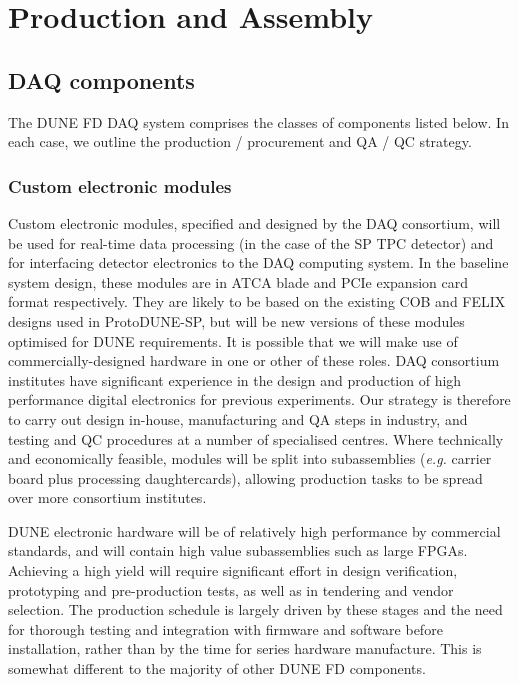 
\section{Production and Assembly}
\label{sec:fd-daq-prod-assy}

\subsection{DAQ components}

The DUNE FD DAQ system comprises the classes of components listed below. In each case, we outline the production / procurement and QA / QC strategy.

\subsubsection{Custom electronic modules}

Custom electronic modules, specified and designed by the DAQ consortium,
will be used for real-time data processing (in the case of the SP TPC
detector) and for interfacing detector electronics to the DAQ computing
system. In the baseline system design, these modules are in ATCA blade
and PCIe expansion card format respectively. They are likely to be based
on the existing COB and FELIX designs used in ProtoDUNE-SP, but will be
new versions of these modules optimised for DUNE requirements. It is
possible that we will make use of commercially-designed hardware in one
or other of these roles. DAQ consortium institutes have significant
experience in the design and production of high performance digital
electronics for previous experiments. Our strategy is therefore to carry
out design in-house, manufacturing and QA steps in industry, and testing
and QC procedures at a number of specialised centres. Where technically
and economically feasible, modules will be split into subassemblies
({\it e.g.} carrier board plus processing daughtercards), allowing
production tasks to be spread over more consortium institutes.

DUNE electronic hardware will be of relatively high performance by commercial standards, and will contain high value subassemblies such as large FPGAs. Achieving a high yield will require significant effort in design verification, prototyping and pre-production tests, as well as in tendering and vendor selection. The production schedule is largely driven by these stages and the need for thorough testing and integration with firmware and software before installation, rather than by the time for series hardware manufacture. This is somewhat different to the majority of other DUNE FD components.

